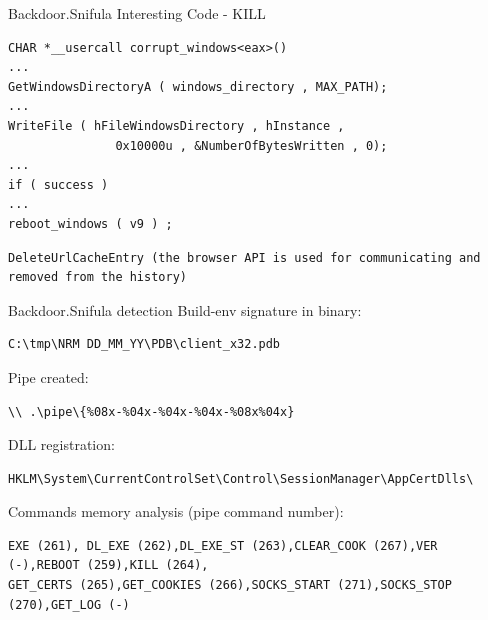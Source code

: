 \begin{frame}[t,fragile]{Backdoor.Snifula Interesting Code - KILL}

\begin{lstlisting}
CHAR *__usercall corrupt_windows<eax>() 
...
GetWindowsDirectoryA ( windows_directory , MAX_PATH);
...
WriteFile ( hFileWindowsDirectory , hInstance ,  
               0x10000u , &NumberOfBytesWritten , 0);
...
if ( success )
...
reboot_windows ( v9 ) ;
\end{lstlisting}

\begin{lstlisting}[basicstyle={\tiny}]DeleteUrlCacheEntry (the browser API is used for communicating and removed from the history)
\end{lstlisting}
\end{frame}


\begin{frame}[t,fragile]{Backdoor.Snifula detection}
        Build-env signature in binary: \begin{lstlisting}
C:\tmp\NRM DD_MM_YY\PDB\client_x32.pdb
                \end{lstlisting}

                Pipe created: \begin{lstlisting}
\\ .\pipe\{%08x-%04x-%04x-%04x-%08x%04x}
                \end{lstlisting}

                DLL registration: \begin{lstlisting}[basicstyle={\tiny}]
HKLM\System\CurrentControlSet\Control\SessionManager\AppCertDlls\
\end{lstlisting}
Commands memory analysis (pipe command number): \begin{lstlisting}[basicstyle={\tiny}]
EXE (261), DL_EXE (262),DL_EXE_ST (263),CLEAR_COOK (267),VER (-),REBOOT (259),KILL (264),
GET_CERTS (265),GET_COOKIES (266),SOCKS_START (271),SOCKS_STOP (270),GET_LOG (-)
\end{lstlisting}

\end{frame}


